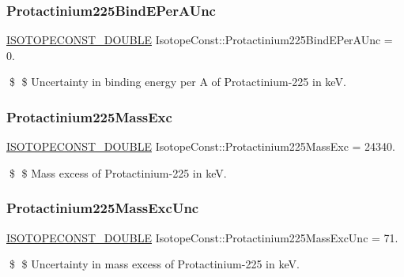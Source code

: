 \subsubsection{\texorpdfstring{Protactinium225\+Bind\+E\+Per\+A\+Unc}{Protactinium225BindEPerAUnc}}
{\footnotesize\ttfamily \mbox{\hyperlink{group___isotope_const-_macros_ga8f45a7272ce02c0b4c65c44636ed719a}{I\+S\+O\+T\+O\+P\+E\+C\+O\+N\+S\+T\+\_\+\+D\+O\+U\+B\+LE}} Isotope\+Const\+::\+Protactinium225\+Bind\+E\+Per\+A\+Unc = 0.}

\$ \$ Uncertainty in binding energy per A of Protactinium-\/225 in keV. \mbox{\label{group___isotope_const-_protactinium-_pa225_ga97422d59eee972eadd18be8389ae8397}} 
\subsubsection{\texorpdfstring{Protactinium225\+Mass\+Exc}{Protactinium225MassExc}}
{\footnotesize\ttfamily \mbox{\hyperlink{group___isotope_const-_macros_ga8f45a7272ce02c0b4c65c44636ed719a}{I\+S\+O\+T\+O\+P\+E\+C\+O\+N\+S\+T\+\_\+\+D\+O\+U\+B\+LE}} Isotope\+Const\+::\+Protactinium225\+Mass\+Exc = 24340.}

\$ \$ Mass excess of Protactinium-\/225 in keV. \mbox{\label{group___isotope_const-_protactinium-_pa225_ga926b9f4af2761149aa2c81a36055d523}} 
\subsubsection{\texorpdfstring{Protactinium225\+Mass\+Exc\+Unc}{Protactinium225MassExcUnc}}
{\footnotesize\ttfamily \mbox{\hyperlink{group___isotope_const-_macros_ga8f45a7272ce02c0b4c65c44636ed719a}{I\+S\+O\+T\+O\+P\+E\+C\+O\+N\+S\+T\+\_\+\+D\+O\+U\+B\+LE}} Isotope\+Const\+::\+Protactinium225\+Mass\+Exc\+Unc = 71.}

\$ \$ Uncertainty in mass excess of Protactinium-\/225 in keV. \mbox{\label{group___isotope_const-_protactinium-_pa225_ga7bf0c3acf43b989ed2c950b3cf1cb5d8}} 
